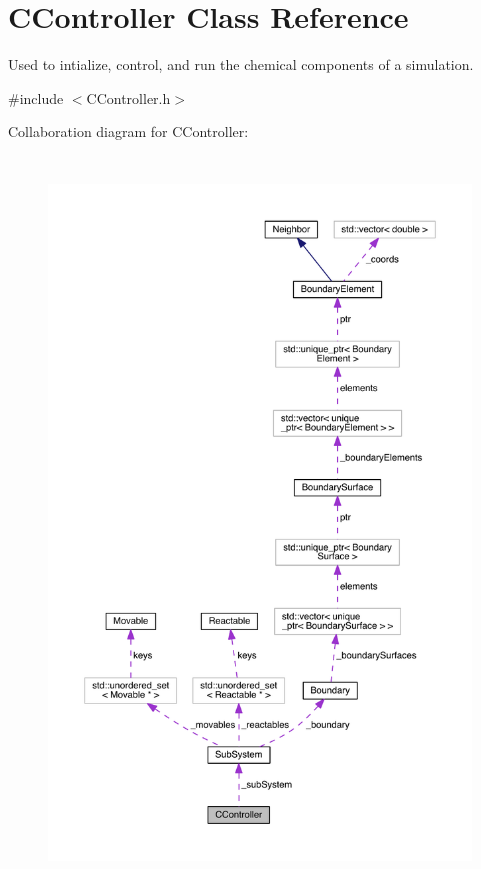 \hypertarget{classCController}{\section{C\+Controller Class Reference}
\label{classCController}
}


Used to intialize, control, and run the chemical components of a simulation.  




{\ttfamily \#include $<$C\+Controller.\+h$>$}



Collaboration diagram for C\+Controller\+:\nopagebreak
\begin{figure}[H]
\begin{center}
\leavevmode
\includegraphics[height=550pt]{classCController__coll__graph}
\end{center}
\end{figure}
